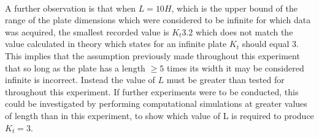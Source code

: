 \documentclass[11pt,twocolumn]{article} %
\begin{document}
\\ \par 
 A further observation is that when $L=10H$, which is the upper bound of the range of the plate dimensions which were considered to be infinite for which data was acquired, the smallest recorded value is $K_{t}3.2$ which does not match the value calculated in theory which states for an infinite plate $K_{t}$ should equal $3$. This implies that the assumption previously made throughout this experiment that so long as the plate has a length $\geq 5$ times its width it may be considered infinite is incorrect. Instead the value of $L$ must be greater than tested for throughout this experiment. If further experiments were to be conducted, this could be investigated by performing computational simulations at greater values of length than in this experiment, to show which value of L is required to produce $K_{t} = 3$.
\end{document}
